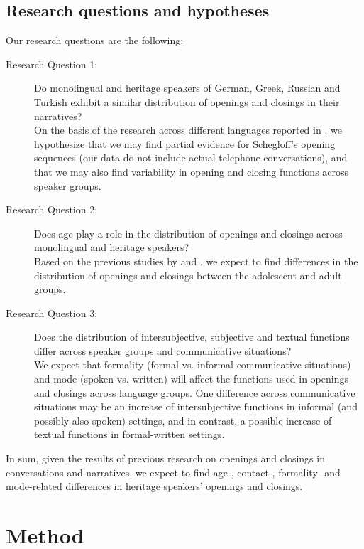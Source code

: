 \documentclass[output=paper,colorlinks,citecolor=brown]{langscibook}
\begin{document}
 \subsection{Research questions and hypotheses}
 Our research questions are the following: 
 \begin{description}
     \item [Research Question 1:] Do monolingual and heritage speakers of German, Greek, Russian and Turkish exhibit a similar distribution of openings and closings in their narratives?\\
     On the basis of the research across different languages reported in , we hypothesize that we may find partial evidence for Schegloff’s opening sequences (our data do not include actual telephone conversations), and that we may also find variability in opening and closing functions across speaker groups. 
     \item [Research Question 2:] Does age play a role in the distribution of openings and closings across monolingual and heritage speakers?\\ 
     Based on the previous studies by \textcite{tolchinsky_text_2002} and \textcite{dollnick_entwicklung_2013}, we expect to find differences in the distribution of openings and closings between the adolescent and adult groups.
     \item [Research Question 3:] Does the distribution of intersubjective, subjective and textual functions differ across speaker groups and communicative situations?\\
     We expect that formality (formal vs. informal communicative situations) and mode (spoken vs. written) will affect the functions used in openings and closings across language groups. One difference across communicative situations may be an increase of intersubjective functions in informal (and possibly also spoken) settings, and in contrast, a possible increase of textual functions in formal-written settings.  
 \end{description}
 In sum, given the results of previous research on openings and closings in conversations and narratives, we expect to find age-, contact-, formality- and mode-related differences in heritage speakers’ openings and closings.

 \section{Method}
\end{document}
